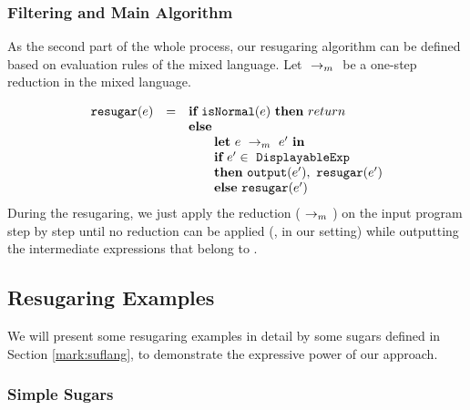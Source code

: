 
\subsubsection{Filtering and Main Algorithm}

As the second part of the whole process, our resugaring algorithm can be defined based on evaluation rules of the mixed language. Let $~\rightarrow_m~$ be a one-step reduction in the mixed language.

\[
\begin{array}{llll}
\mbox{\tt resugar} (e) &=& \mbox{\rm \bf if}~\mbox{\tt isNormal}(e)~\mbox{\rm \bf then}~return\\
              & & \mbox{\rm \bf else}~\\
							& & \qquad \mbox{\rm \bf let}~e ~\rightarrow_m~e'~\mbox{\rm \bf in}\\
							& & \qquad \mbox{\rm \bf if}~e' \in~\mbox{\tt DisplayableExp} \\
							& & \qquad \mbox{\rm \bf then}~\mbox{\tt output}(e'),~\mbox{\tt resugar}(e')\\
							& & \qquad \mbox{\rm \bf else}~\mbox{\tt resugar}(e')
\end{array}
\]
During the resugaring, we just apply the reduction ($~\rightarrow_m~$) on the input program step by step until no reduction can be applied (,  in our setting) while outputting the intermediate expressions that belong to .

\subsection{Resugaring Examples}
\label{mark:resugaringexample}
We will present some resugaring examples in detail by some sugars defined in Section \ref{mark:suflang}, to demonstrate the expressive power of our approach.

\subsubsection{Simple Sugars}
\label{mark:simple}

